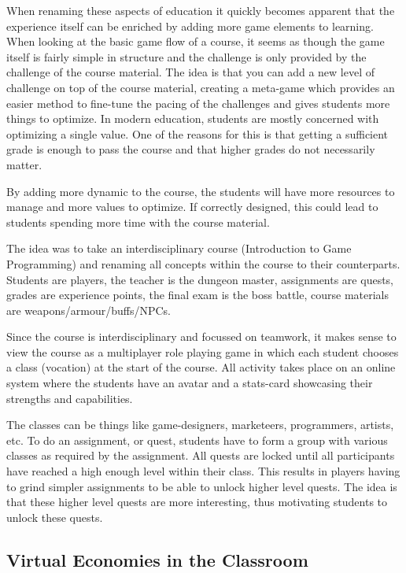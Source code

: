\documentclass[11pt]{article}
\begin{document}
When renaming these aspects of education it quickly becomes apparent that the experience itself can be enriched by adding more game elements to learning. When looking at the basic game flow of a course, it seems as though the game itself is fairly simple in structure and the challenge is only provided by the challenge of the course material. The idea is that you can add a new level of challenge on top of the course material, creating a meta-game which provides an easier method to fine-tune the pacing of the challenges and gives students more things to optimize. In modern education, students are mostly concerned with optimizing a single value. One of the reasons for this is that getting a sufficient grade is enough to pass the course and that higher grades do not necessarily matter. 

By adding more dynamic to the course, the students will have more resources to manage and more values to optimize. If correctly designed, this could lead to students spending more time with the course material. 

The idea was to take an interdisciplinary course (Introduction to Game Programming) and renaming all concepts within the course to their counterparts. Students are players, the teacher is the dungeon master, assignments are quests, grades are experience points, the final exam is the boss battle, course materials are weapons/armour/buffs/NPCs.

Since the course is interdisciplinary and focussed on teamwork, it makes sense to view the course as a multiplayer role playing game in which each student chooses a class (vocation) at the start of the course. All activity takes place on an online system where the students have an avatar and a stats-card showcasing their strengths and capabilities.

The classes can be things like game-designers, marketeers, programmers, artists, etc. To do an assignment, or quest, students have to form a group with various classes as required by the assignment. All quests are locked until all participants have reached a high enough level within their class. This results in players having to grind simpler assignments to be able to unlock higher level quests. The idea is that these higher level quests are more interesting, thus motivating students to unlock these quests. 

\subsection{Virtual Economies in the Classroom}
\end{document}

